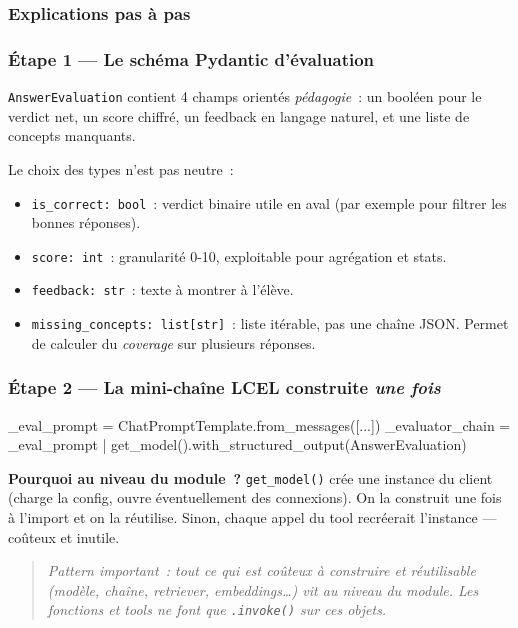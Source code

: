 \documentclass[11pt,a4paper]{article}
\begin{document}
\subsubsection{Explications pas à pas}

\subsubsection*{Étape 1 — Le schéma Pydantic d'évaluation}

\texttt{AnswerEvaluation} contient 4 champs orientés
\emph{pédagogie}~: un booléen pour le verdict net, un score chiffré, un
feedback en langage naturel, et une liste de concepts manquants.

Le choix des types n'est pas neutre~:
\begin{itemize}[leftmargin=*]
  \item \texttt{is\_correct: bool}~: verdict binaire utile en aval
        (par exemple pour filtrer les bonnes réponses).
  \item \texttt{score: int}~: granularité 0-10, exploitable pour
        agrégation et stats.
  \item \texttt{feedback: str}~: texte à montrer à l'élève.
  \item \texttt{missing\_concepts: list[str]}~: liste itérable, pas
        une chaîne JSON. Permet de calculer du \emph{coverage} sur
        plusieurs réponses.
\end{itemize}

\subsubsection*{Étape 2 — La mini-chaîne LCEL construite \emph{une fois}}

\begin{pythoncode}
_eval_prompt = ChatPromptTemplate.from_messages([...])
_evaluator_chain = _eval_prompt | get_model().with_structured_output(AnswerEvaluation)
\end{pythoncode}

\textbf{Pourquoi au niveau du module~?} \texttt{get\_model()} crée une
instance du client (charge la config, ouvre éventuellement des
connexions). On la construit une fois à l'import et on la réutilise.
Sinon, chaque appel du tool recréerait l'instance — coûteux et
inutile.

\begin{quote}\itshape
Pattern important~: tout ce qui est \emph{coûteux à construire et
réutilisable} (modèle, chaîne, retriever, embeddings\dots) vit au
niveau du module. Les fonctions et tools ne font que \texttt{.invoke()}
sur ces objets.
\end{quote}
\end{document}
